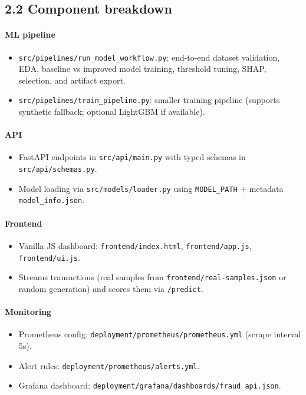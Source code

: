 \documentclass[11pt]{article}
\newcommand{\code}[1]{\texttt{#1}}
\begin{document}
\subsection*{2.2 Component breakdown}
\paragraph{ML pipeline}
\begin{itemize}
  \item \code{src/pipelines/run\_model\_workflow.py}: end-to-end dataset validation, EDA, baseline vs improved model training, threshold tuning, SHAP, selection, and artifact export.
  \item \code{src/pipelines/train\_pipeline.py}: smaller training pipeline (supports synthetic fallback; optional LightGBM if available).
\end{itemize}

\paragraph{API}
\begin{itemize}
  \item FastAPI endpoints in \code{src/api/main.py} with typed schemas in \code{src/api/schemas.py}.
  \item Model loading via \code{src/models/loader.py} using \code{MODEL\_PATH} + metadata \code{model\_info.json}.
\end{itemize}

\paragraph{Frontend}
\begin{itemize}
  \item Vanilla JS dashboard: \code{frontend/index.html}, \code{frontend/app.js}, \code{frontend/ui.js}.
  \item Streams transactions (real samples from \code{frontend/real-samples.json} or random generation) and scores them via \code{/predict}.
\end{itemize}

\paragraph{Monitoring}
\begin{itemize}
  \item Prometheus config: \code{deployment/prometheus/prometheus.yml} (scrape interval 5s).
  \item Alert rules: \code{deployment/prometheus/alerts.yml}.
  \item Grafana dashboard: \code{deployment/grafana/dashboards/fraud\_api.json}.
\end{itemize}
\end{document}
